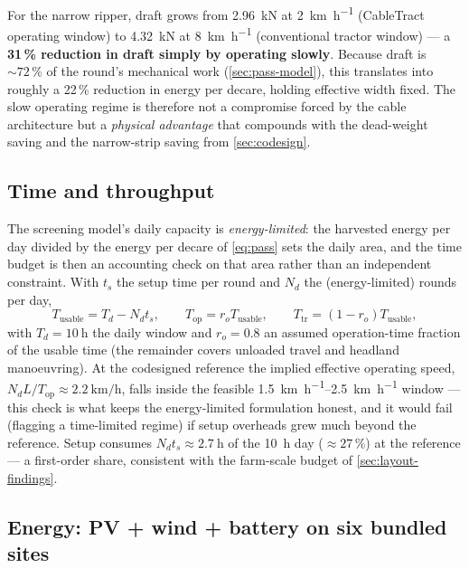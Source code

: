 \documentclass[11pt,a4paper]{article}
\begin{document}
For the narrow ripper, draft grows from \SI{2.96}{\kilo\newton} at \SI{2}{\kilo\meter\per\hour} (CableTract operating window) to \SI{4.32}{\kilo\newton} at \SI{8}{\kilo\meter\per\hour} (conventional tractor window) --- a \textbf{31\,\% reduction in draft simply by operating slowly}. Because draft is ${\sim}72\,\%$ of the round's mechanical work (\cref{sec:pass-model}), this translates into roughly a 22\,\% reduction in energy per decare, holding effective width fixed. The slow operating regime is therefore not a compromise forced by the cable architecture but a \emph{physical advantage} that compounds with the dead-weight saving and the narrow-strip saving from \cref{sec:codesign}.

\subsection{Time and throughput}\label{sec:time}

The screening model's daily capacity is \emph{energy-limited}: the harvested energy per day divided by the energy per decare of \cref{eq:pass} sets the daily area, and the time budget is then an accounting check on that area rather than an independent constraint. With $t_s$ the setup time per round and $N_d$ the (energy-limited) rounds per day,
\begin{equation}\label{eq:time}
T_{\text{usable}} = T_d - N_d t_s, \qquad
T_{\text{op}} = r_o T_{\text{usable}}, \qquad
T_{\text{tr}} = (1 - r_o) T_{\text{usable}},
\end{equation}
with $T_d = \SI{10}{\hour}$ the daily window and $r_o = 0.8$ an assumed operation-time fraction of the usable time (the remainder covers unloaded travel and headland manoeuvring). At the codesigned reference the implied effective operating speed, $N_d L / T_{\text{op}} \approx \SI{2.2}{\kilo\meter\per\hour}$, falls inside the feasible \SIrange{1.5}{2.5}{\kilo\meter\per\hour} window --- this check is what keeps the energy-limited formulation honest, and it would fail (flagging a time-limited regime) if setup overheads grew much beyond the reference. Setup consumes $N_d t_s \approx \SI{2.7}{\hour}$ of the \SI{10}{\hour} day (${\approx}27\,\%$) at the reference --- a first-order share, consistent with the farm-scale budget of \cref{sec:layout-findings}.

\subsection{Energy: PV + wind + battery on six bundled sites}\label{sec:energy}
\end{document}
